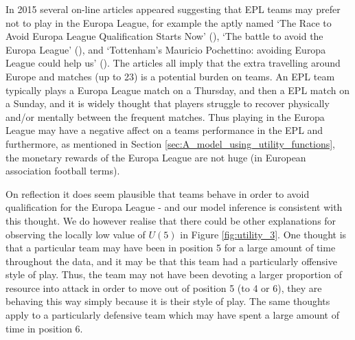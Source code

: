 In 2015 several on-line articles appeared suggesting that \gls{EPL} teams may prefer not to play in the Europa League,
for example the aptly named `The Race to Avoid Europa League Qualification Starts Now' (\cite{raceToAvoidEurope}), `The
battle to avoid the Europa League' (\cite{battleToAvoidEurople}), and `Tottenham's Mauricio Pochettino: avoiding Europa
League could help us' (\cite{spursAvoidEurople}). The articles all imply that the extra travelling around Europe and
matches (up to 23) is a potential burden on teams. An \gls{EPL} team typically plays a Europa League match on a
Thursday, and then a \gls{EPL} match on a Sunday, and it is widely thought that players struggle to recover physically
and/or mentally between the frequent matches. Thus playing in the Europa League may have a negative affect on a teams
performance in the \gls{EPL} and furthermore, as mentioned in Section \ref{sec:A_model_using_utility_functions}, the
monetary rewards of the Europa League are not huge (in European association football terms).

On reflection it does seem plausible that teams behave in order to avoid qualification for the Europa League - and our
model inference is consistent with this thought. We do however realise that there could be other explanations for
observing the locally low value of \(U(5)\) in Figure \ref{fig:utility_3}. One thought is that a particular team may
have been in position 5 for a large amount of time throughout the data, and it may be that this team had a particularly
offensive style of play. Thus, the team may not have been devoting a larger proportion of resource into attack in order
to move out of position 5 (to 4 or 6), they are behaving this way simply because it is their style of play. The same
thoughts apply to a particularly defensive team which may have spent a large amount of time in position 6.


